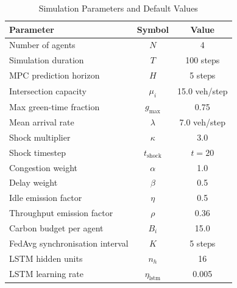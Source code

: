 \documentclass[journal]{IEEEtran}
\begin{document}
\begin{table}[!t]
\renewcommand{\arraystretch}{1.3}
\caption{Simulation Parameters and Default Values}
\label{tab_params}
\centering
\begin{tabular}{|l|c|c|}
\hline
\textbf{Parameter}            & \textbf{Symbol}            & \textbf{Value}        \\ \hline
Number of agents              & $N$                        & 4                     \\ \hline
Simulation duration           & $T$                        & 100 steps             \\ \hline
MPC prediction horizon        & $H$                        & 5 steps               \\ \hline
Intersection capacity         & $\mu_i$                    & 15.0 veh/step         \\ \hline
Max green-time fraction       & $g_{\max}$                 & 0.75                  \\ \hline
Mean arrival rate             & $\lambda$                  & 7.0 veh/step          \\ \hline
Shock multiplier              & $\kappa$                   & 3.0                   \\ \hline
Shock timestep                & $t_{\text{shock}}$         & $t=20$                \\ \hline
Congestion weight             & $\alpha$                   & 1.0                   \\ \hline
Delay weight                  & $\beta$                    & 0.5                   \\ \hline
Idle emission factor          & $\eta$                     & 0.5                   \\ \hline
Throughput emission factor    & $\rho$                     & 0.36                  \\ \hline
Carbon budget per agent       & $B_i$                      & 15.0                  \\ \hline
FedAvg synchronisation interval & $K$                      & 5 steps               \\ \hline
LSTM hidden units             & $n_h$                      & 16                    \\ \hline
LSTM learning rate            & $\eta_{\text{lstm}}$       & 0.005                 \\ \hline
\end{tabular}
\end{table}
\end{document}

